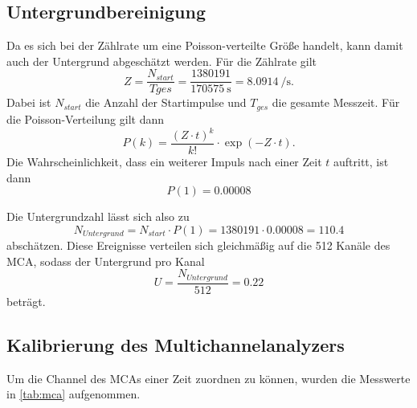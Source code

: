 \subsection{Untergrundbereinigung}

Da es sich bei der Zählrate um eine Poisson-verteilte Größe handelt, kann damit auch der Untergrund abgeschätzt werden. 
Für die Zählrate gilt
\begin{equation*}
  Z = \frac{N_{start}}{T{ges}} = \frac{1380191}{\SI{170575}{\s}} = \SI{8.0914}{\per\s}.
\end{equation*}
Dabei ist $N_{start}$ die Anzahl der Startimpulse und $T_{ges}$ die gesamte Messzeit. Für die Poisson-Verteilung gilt dann 
\begin{equation*}
  P(k) = \frac{(Z \cdot t)^k}{k!} \cdot \exp(-Z \cdot t).
\end{equation*}
Die Wahrscheinlichkeit, dass ein weiterer Impuls nach einer Zeit $t$ auftritt, ist dann
\begin{equation*}
  P(1) = 0.00008
\end{equation*}

Die Untergrundzahl lässt sich also zu
\begin{equation*}
  N_{Untergrund} = N_{start} \cdot P(1) = 1380191 \cdot 0.00008 = 110.4
\end{equation*}
abschätzen. Diese Ereignisse verteilen sich gleichmäßig auf die 512 Kanäle des MCA, sodass der Untergrund pro Kanal
\begin{equation*}
  U = \frac{N_{Untergrund}}{512} = 0.22
\end{equation*}
beträgt.

\subsection{Kalibrierung des Multichannelanalyzers}

Um die Channel des MCAs einer Zeit zuordnen zu können, wurden die Messwerte in \autoref{tab:mca} aufgenommen.

